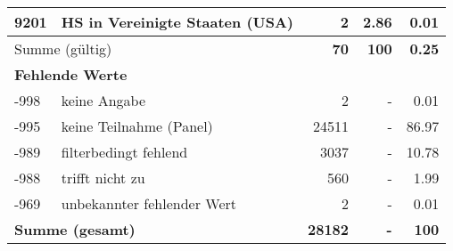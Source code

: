 \begin{longtable}{lXrrr}
     9201 &
     \multicolumn{1}{X}{ HS in Vereinigte Staaten (USA)   } &


       \num{2} &
       \num[round-mode=places,round-precision=2]{2.86} &
         \num[round-mode=places,round-precision=2]{0.01} \\
     \midrule
     \multicolumn{2}{l}{Summe (gültig)} &
       \textbf{\num{70}} &
     \textbf{100} &
       \textbf{\num[round-mode=places,round-precision=2]{0.25}} \\
     \multicolumn{5}{l}{\textbf{Fehlende Werte}}\\
       -998 &
       keine Angabe &
         \num{2} &
        - &
         \num[round-mode=places,round-precision=2]{0.01} \\
       -995 &
       keine Teilnahme (Panel) &
         \num{24511} &
        - &
         \num[round-mode=places,round-precision=2]{86.97} \\
       -989 &
       filterbedingt fehlend &
         \num{3037} &
        - &
         \num[round-mode=places,round-precision=2]{10.78} \\
       -988 &
       trifft nicht zu &
         \num{560} &
        - &
         \num[round-mode=places,round-precision=2]{1.99} \\
       -969 &
       unbekannter fehlender Wert &
         \num{2} &
        - &
         \num[round-mode=places,round-precision=2]{0.01} \\
     \midrule
     \multicolumn{2}{l}{\textbf{Summe (gesamt)}} &
          \textbf{\num{28182}} &
        \textbf{-} &
        \textbf{100} \\
     \bottomrule
     \end{longtable}
     

